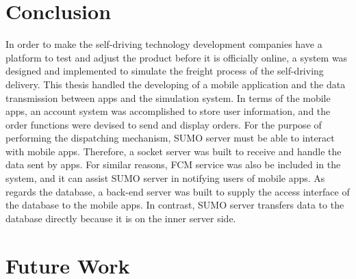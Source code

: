 \documentclass[12pt]{ksthesis}
\begin{document}
\begin{thesis}
{\section{Conclusion}
In order to make the self-driving technology development companies have a platform to test and adjust the product before it is officially online, a system was designed and implemented to simulate the freight process of the self-driving delivery. This thesis handled the developing of a mobile application and the data transmission between apps and the simulation system. In terms of the mobile apps, an account system was accomplished to store user information, and the order functions were devised to send and display orders. For the purpose of performing the dispatching mechanism, SUMO server must be able to interact with mobile apps. Therefore, a socket server was built to receive and handle the data sent by apps. For similar reasons, FCM service was also be included in the system, and it can assist SUMO server in notifying users of mobile apps. As regards the database, a back-end server was built to supply the access interface of the database to the mobile apps. In contrast, SUMO server transfers data to the database directly because it is on the inner server side.


\section{Future Work}


} \end{thesis}

\singlespace {\large



}



\doublespace

\begin{vita}
\Thesisspace \large{


}\end{vita}
\end{document}
